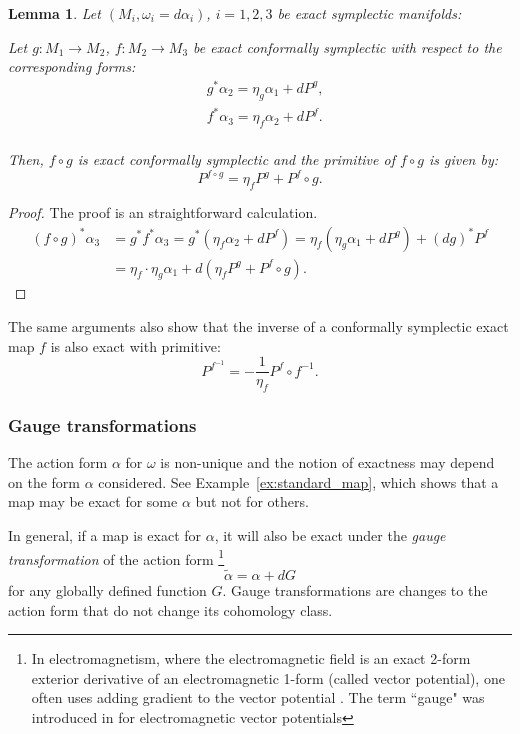 \documentclass[11pt]{amsart}
\newtheorem{lem}[thm]{Lemma}
\theoremstyle{definition}
\theoremstyle{remark}
\numberwithin{equation}{section}
\begin{document}
\begin{lem} \label{exact_composition}
  Let $(M_i, \omega_i = d \alpha_i)$, $i = 1,2,3$
  be exact symplectic manifolds:

  Let $g:M_1 \rightarrow M_2$,
  $f:M_2 \rightarrow M_3$
  be exact conformally symplectic with respect to
  the corresponding forms:
  \[
  \begin{split}
    & g^* \alpha_2 = \eta_g \alpha_1 + dP^g,\\
    & f^* \alpha_3 = \eta_f \alpha_2 + dP^f .\\
  \end{split}
  \]


  Then, $f\circ g$ is exact conformally symplectic and the primitive of $f\circ g$ is given by:
  \begin{equation}\label{eqn:primitivefg}
  P^{f\circ g}=\eta_f  P^g + P^f\circ g .
  \end{equation}
\end{lem}
\begin{proof}
The proof is an straightforward calculation.
  \begin{equation}\label{eqn:exact_composition}
  \begin{split}
    (f \circ g)^* \alpha_3  &= g^* f^* \alpha_3  = g^*( \eta_f \alpha_2  + d P^f  )=
    \eta_f  ( \eta_g  \alpha_1  +  dP^g ) + (d g)^* P^f \\
    &= \eta_f \cdot \eta_g  \alpha_1 + d( \eta_f  P^g + P^f\circ g) .
\end{split}
  \end{equation}
\end{proof}

The same arguments also show that the inverse of a conformally symplectic exact
map $f$ is also exact with primitive:
  \begin{equation}\label{eqn:primitiveinverse}
  P^{f^{-1}}=-\frac{1}{\eta_f}   P^f\circ f^{-1} .
  \end{equation}


\subsubsection{Gauge transformations}\label{sec:gauge}
The action form $\alpha$ for $\omega$ is non-unique and
the notion of exactness may depend on the form $\alpha$ considered.
See   Example~\ref{ex:standard_map}, which shows that a map may be exact
for some $\alpha$  but not for others.

In general, if a map
is exact for $\alpha$, it will also be exact under the \emph{gauge transformation} of the action form
\footnote{In electromagnetism, where the electromagnetic field
is an exact 2-form exterior derivative of an electromagnetic
1-form (called vector potential),  one often
uses adding gradient
to the vector potential \cite{Thirring, Zangwill}. The term ``gauge" was introduced in \cite{Weyl51} for electromagnetic vector potentials }
\begin{equation}\label{eqn:tilde_alpha}
 \tilde \alpha = \alpha + dG
\end{equation}
for any globally defined function $G$.
Gauge transformations
are changes
to the action form that do not change its cohomology class.
\end{document}
